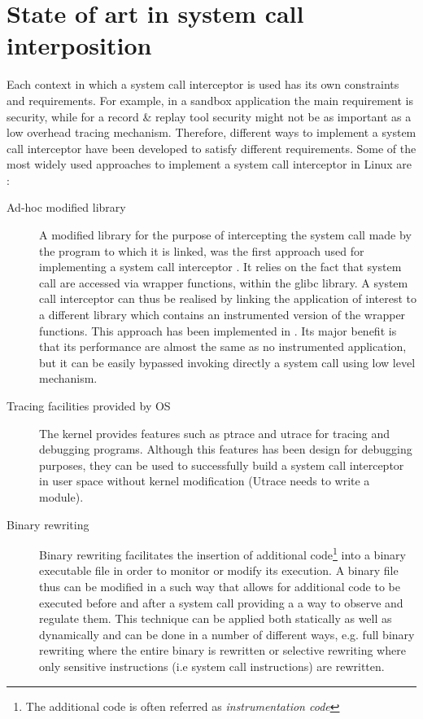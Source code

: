 \section{State of art in system call interposition}

Each context in which a system call interceptor is used has its own constraints and requirements. For example, in a sandbox application the main requirement is security, while for a record \& replay tool security might not be as important as a low overhead tracing mechanism. Therefore, different ways to implement a system call interceptor have been developed to satisfy different requirements. Some of the most widely used approaches to implement a system call interceptor in Linux are :
\begin{description}

\item[Ad-hoc modified library]	A modified library for the purpose of intercepting the system call made by the program to which it is linked,  was the first approach used for implementing a system call interceptor \cite{plashglibc, Saito05jockey:a}. It relies on the fact that system call are accessed via  wrapper functions, within the glibc library. A system call interceptor can thus be realised by linking the application of interest to a different library which contains an instrumented version of the wrapper functions. This approach has been implemented in \cite{plashglibc}. Its major benefit is that its performance are almost the same as no instrumented application, but it can be easily bypassed invoking directly a system call using low level mechanism.  


\item[Tracing facilities  provided by OS] The kernel provides features such as ptrace and utrace for tracing and debugging programs. Although this features has been design for debugging purposes, they can be used to successfully build  a system call interceptor in user space without kernel modification (Utrace needs to write a module). 

\item[Binary rewriting]  Binary rewriting facilitates the insertion of additional code\footnote{The additional code is often referred as \emph{instrumentation code}} into a binary executable file in order to monitor or modify its execution. A binary file thus can be modified in a such way that allows for additional code to be executed before and after a system call providing a a way to observe and regulate them. This technique can be applied both statically as well as dynamically and can be done in a number of different ways, e.g. full binary rewriting where the entire binary is rewritten \cite{DynamoRio, Valgrind} or selective rewriting where only sensitive instructions (i.e system call instructions) are rewritten.


\end{description}
